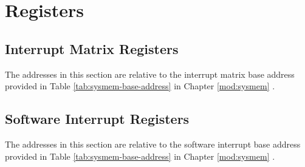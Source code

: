 \documentclass[main\_\_EN.tex]{subfiles}
\begin{document}


\newpage
\section{Registers}

\subsection{Interrupt Matrix Registers}

The addresses in this section are relative to  the interrupt matrix base address provided in Table \ref{tab:sysmem-base-address} in Chapter \ref{mod:sysmem} \textit{}.



\subsection{Software Interrupt Registers}
\label{sec:intpri-reg}

The addresses in this section are relative to  the software interrupt base address provided in Table \ref{tab:sysmem-base-address} in Chapter \ref{mod:sysmem} \textit{}.


\end{document}
